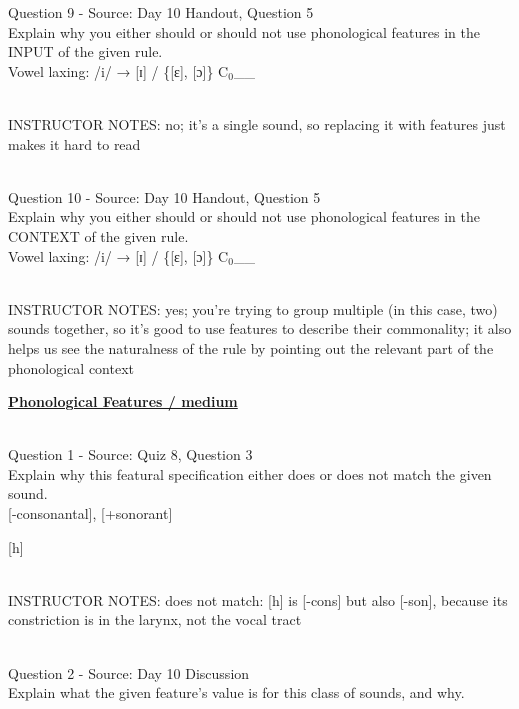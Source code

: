 \documentclass[12pt]{article}
\begin{document}
{\large Question 9} - Source: Day 10 Handout, Question 5\\

Explain why you either should or should not use phonological features in the INPUT of the given rule.\\

Vowel laxing: /i/ → {[ɪ]} / \{{[ɛ]}, {[ɔ]}\} C$_0$\_\_


~\\
INSTRUCTOR NOTES: no; it's a single sound, so replacing it with features just makes it hard to read


~\\

{\large Question 10} - Source: Day 10 Handout, Question 5\\

Explain why you either should or should not use phonological features in the CONTEXT of the given rule.\\

Vowel laxing: /i/ → {[ɪ]} / \{{[ɛ]}, {[ɔ]}\} C$_0$\_\_


~\\
INSTRUCTOR NOTES: yes; you're trying to group multiple (in this case, two) sounds together, so it's good to use features to describe their commonality; it also helps us see the naturalness of the rule by pointing out the relevant part of the phonological context


\newpage\textbf{\underline{\huge Phonological Features / medium\\}}

~\\

{\large Question 1} - Source: Quiz 8, Question 3\\

Explain why this featural specification either does or does not match the given sound.\\

{[-consonantal]}, {[+sonorant]}

{[h]}


~\\
INSTRUCTOR NOTES: does not match: [h] is [-cons] but also [-son], because its constriction is in the larynx, not the vocal tract


~\\

{\large Question 2} - Source: Day 10 Discussion\\

Explain what the given feature’s value is for this class of sounds, and why.\\
\end{document}
